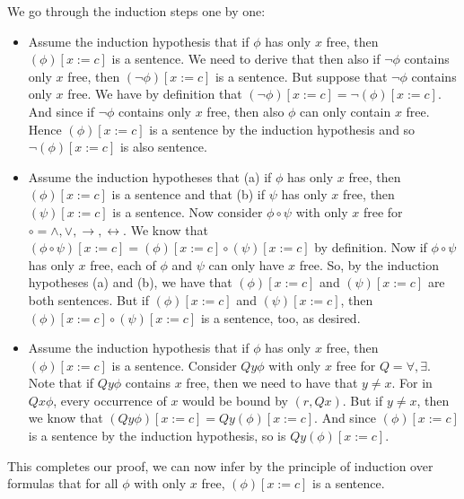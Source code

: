 \begin{itemize}
                    We go through the induction steps one by one:

                    \begin{itemize}
                    \item Assume the induction hypothesis that if
                      $\phi$ has only $x$ free, then $(\phi)[x:=c]$ is a
                    sentence. We need to derive that then also if
                    $\neg\phi$ contains only $x$ free, then 
                    $(\neg\phi)[x:=c]$ is a sentence. But suppose that
                    $\neg\phi$ contains only $x$ free. We have by
                    definition that $(\neg\phi)[x:=c]=\neg
                    (\phi)[x:=c]$. And since if $\neg \phi$ contains
                    only $x$ free, then also $\phi$ can only contain
                    $x$ free. Hence $(\phi)[x:=c]$ is a sentence by
                    the induction hypothesis and so $\neg(\phi)[x:=c]$
                    is also sentence.


                    \item Assume the induction hypotheses that (a) if
                      $\phi$ has only $x$ free, then $(\phi)[x:=c]$ is a
                    sentence and that (b) if
                      $\psi$ has only $x$ free, then $(\psi)[x:=c]$ is a
                    sentence. Now consider $\phi\circ\psi$ with only
                    $x$ free for
                    $\circ=\land,\lor,\to,\leftrightarrow$. We know that
                    $(\phi\circ\psi)[x:=c]=(\phi)[x:=c]\circ
                    (\psi)[x:=c]$ by definition. Now if
                    $\phi\circ\psi$ has only $x$ free, each of $\phi$
                    and $\psi$ can only have $x$ free. So, by the
                    induction hypotheses (a) and (b), we have that
                    $(\phi)[x:=c]$ and $(\psi)[x:=c]$ are both
                    sentences. But if $(\phi)[x:=c]$ and
                    $(\psi)[x:=c]$, then
                    $(\phi)[x:=c]\circ(\psi)[x:=c]$ is a sentence,
                    too, as desired.

                    \item Assume the induction hypothesis that if
                      $\phi$ has only $x$ free, then $(\phi)[x:=c]$ is a
                    sentence. Consider $Qy\phi$ with only $x$ free for
                    $Q=\forall,\exists$. Note that if $Qy\phi$
                    contains $x$ free, then we need to have that
                    $y\neq x$. For in $Qx\phi$, every occurrence of
                    $x$ would be bound by $(r,Qx)$. But if $y\neq x$,
                    then we know that
                    $(Qy\phi)[x:=c]=Qy(\phi)[x:=c]$. And since
                    $(\phi)[x:=c]$ is a sentence by the induction
                    hypothesis, so is $Qy(\phi)[x:=c]$. 
                    \end{itemize}
                    This completes our proof, we can now infer by the
                    principle of induction over formulas that for all
                    $\phi$ with only $x$ free, $(\phi)[x:=c]$ is a
                    sentence.


\end{itemize}
